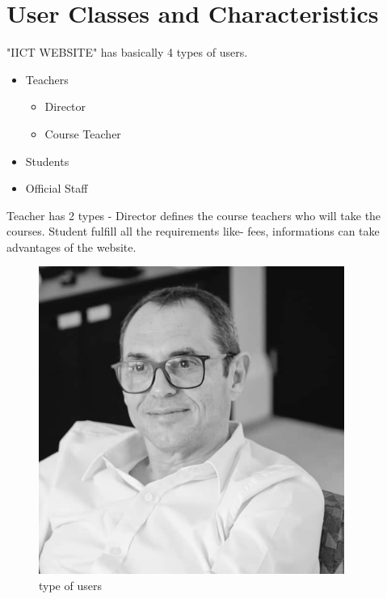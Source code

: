 \documentclass{scrreprt}
\begin{document}
\section{User Classes and Characteristics}
"IICT WEBSITE" has basically 4 types of users. 
\begin{itemize}
  \item Teachers
    \begin{itemize}
        \item Director
        \item Course Teacher
    \end{itemize}
  \item Students
  \item Official Staff
\end{itemize}
Teacher has 2 types - Director defines the course teachers who will take the courses. Student fulfill all the requirements like- fees, informations can take advantages of the website. 
\begin{figure}
    \centering
    \includegraphics[width=10cm]{ricardo.jpg}
    \caption{type of users}
    \label{fig:type of users}
\end{figure}
\end{document}
